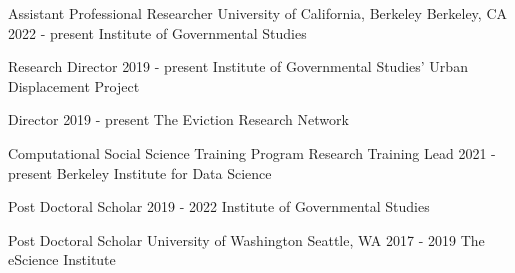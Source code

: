 

\begin{cventries}



  \cventry
    {Assistant Professional Researcher} %
    {University of California, Berkeley} %
    {Berkeley, CA} %
    {2022 - present} %
    {Institute of Governmental Studies}

  \cventry
    {Research Director} %
    {} %
    {} %
    {2019 - present} %
    {Institute of Governmental Studies' Urban Displacement Project}
    
  \cventry
    {Director} %
    {} %
    {} %
    {2019 - present} %
    {The Eviction Research Network}    

  \cventry
    {Computational Social Science Training Program Research Training Lead} %
    {} %
    {} %
    {2021 - present} %
    {Berkeley Institute for Data Science\newline}
    
  \cventry
    {Post Doctoral Scholar} %
    {} %
    {} %
    {2019 - 2022} %
    {Institute of Governmental Studies\newline}

  \cventry
    {Post Doctoral Scholar} %
    {University of Washington} %
    {Seattle, WA} %
    {2017 - 2019} %
    {The eScience Institute}

\end{cventries}
